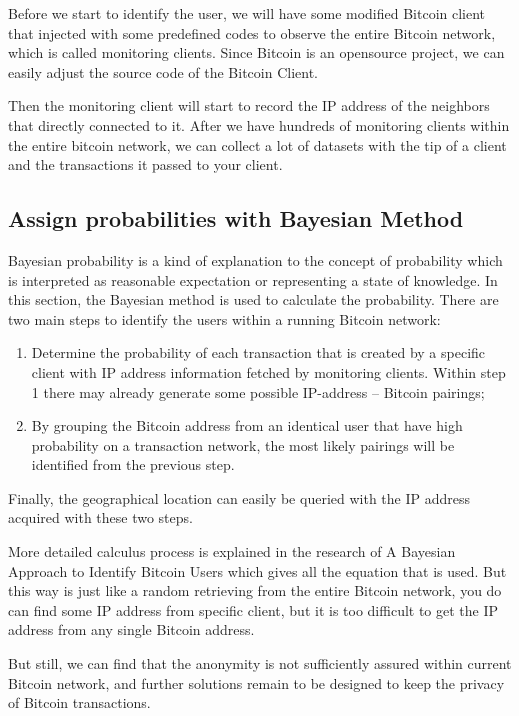 \documentclass[runningheads]{llncs}
\begin{document}
Before we start to identify the user, we will have some modified Bitcoin client that injected with some predefined codes to observe the entire Bitcoin network, which is called monitoring clients. Since Bitcoin is an opensource project, we can easily adjust the source code of the Bitcoin Client. 

Then the monitoring client will start to record the IP address of the neighbors that directly connected to it. After we have hundreds of monitoring clients within the entire bitcoin network, we can collect a lot of datasets with the tip of a client and the transactions it passed to your client.


\subsection{Assign probabilities with Bayesian Method}

Bayesian probability is a kind of explanation to the concept of probability which is interpreted as reasonable expectation\cite{cox1946probability} or representing a state of knowledge\cite{jaynes1986bayesian}. In this section, the Bayesian method is used to calculate the probability. There are two main steps to identify the users within a running Bitcoin network:

\begin{enumerate}
	\item Determine the probability of each transaction that is created by a specific client with IP address information fetched by monitoring clients. Within step 1 there may already generate some possible IP-address – Bitcoin pairings;
	\item By grouping the Bitcoin address from an identical user that have high probability on a transaction network, the most likely pairings will be identified from the previous step.
\end{enumerate}

Finally, the geographical location can easily be queried with the IP address acquired with these two steps.

More detailed calculus process is explained in the research of A Bayesian Approach to Identify Bitcoin Users\cite{juhasz2018bayesian} which gives all the equation that is used. But this way is just like a random retrieving from the entire Bitcoin network, you do can find some IP address from specific client, but it is too difficult to get the IP address from any single Bitcoin address.

But still, we can find that the anonymity is not sufficiently assured within current Bitcoin network, and further solutions remain to be designed to keep the privacy of Bitcoin transactions.
\end{document}
